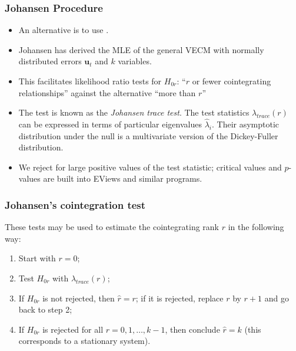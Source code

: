 %
%
\begin{frame}%

\frametitle{Johansen Procedure}

\begin{itemize}
\item An alternative is to use .
\item Johansen has derived the MLE of the general VECM with normally distributed errors $\mathbf{u}_{t}$ and $k$ variables.
\item This facilitates likelihood ratio tests for $H_{0r}$: ``$r$ or fewer cointegrating relationships'' against the alternative ``more than $r$''
\item The test is known as the \emph{\color{red}Johansen trace test}. The test
statistics $\lambda _{trace}(r)$ can be expressed in terms of particular
eigenvalues $\hat{\lambda}_{i}$. Their asymptotic distribution under the
null is a multivariate version of the
Dickey-Fuller distribution.

\item We reject for large positive values of the test statistic; critical
values and $p$-values are built into EViews and similar programs.
\end{itemize}

\end{frame}%

\begin{frame}%

\frametitle{Johansen's cointegration test}

These tests may be used to estimate the cointegrating rank $r$ in the
following way:

\begin{enumerate}
\item Start with $r=0$;

\item Test $H_{0r}$ with $\lambda _{trace}(r)$;

\item If $H_{0r}$ is not rejected, then $\hat{r}=r$; if it is rejected,
replace $r$ by $r+1$ and go back to step 2;

\item If $H_{0r}$ is rejected for all $r=0,1,\ldots ,k-1$, then conclude $%
\hat{r}=k$ (this corresponds to a stationary system).
\end{enumerate}

\end{frame}%

